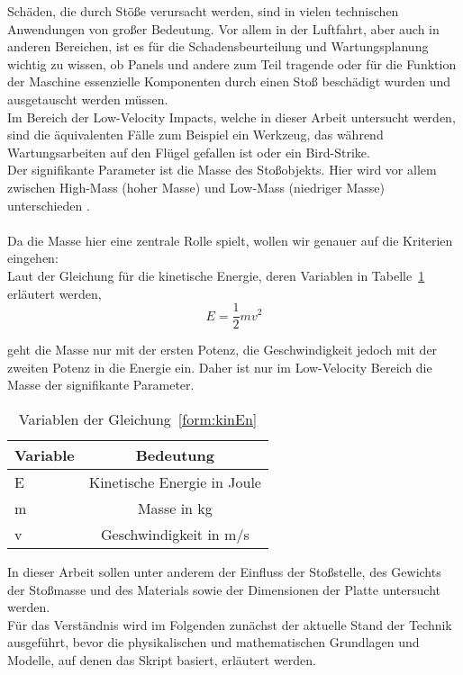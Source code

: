 Schäden, die durch Stöße verursacht werden, sind in vielen technischen
Anwendungen von großer Bedeutung. Vor allem in der Luftfahrt, aber auch in
anderen Bereichen, ist es für die Schadensbeurteilung und Wartungsplanung
wichtig zu wissen, ob Panels und andere zum Teil tragende oder für die Funktion
der Maschine essenzielle Komponenten durch einen Stoß beschädigt wurden und
ausgetauscht werden müssen. \\
Im Bereich der Low-Velocity Impacts, welche in dieser Arbeit untersucht werden,
sind die äquivalenten Fälle zum Beispiel ein Werkzeug, das während
Wartungsarbeiten auf den Flügel gefallen ist oder ein Bird-Strike. \\
Der signifikante Parameter ist die Masse des Stoßobjekts. Hier wird vor allem
zwischen High-Mass (hoher Masse) und Low-Mass (niedriger Masse) unterschieden \cite{Olsson.2000}. \\
\\
Da die Masse hier eine zentrale Rolle spielt, wollen wir genauer auf die
Kriterien eingehen: \\
Laut der Gleichung für die kinetische Energie, deren Variablen in Tabelle~\ref{tab:Tabelle 1} erläutert werden,
\begin{equation}
\label{form:kinEn}
E = \frac{1}{2}mv^2
\end{equation}
 
 geht die Masse nur mit der ersten Potenz, die Geschwindigkeit jedoch mit
 der zweiten Potenz in die Energie ein. Daher ist nur im Low-Velocity Bereich die Masse der signifikante Parameter. 
 
\begin{table}[h!]
	\begin{center}
		\caption{Variablen der Gleichung~\ref{form:kinEn}}
		\label{tab:Tabelle 1}
		\begin{tabular}{l|c}
			\textbf{Variable} & \textbf{Bedeutung}\\
			\hline
			E & Kinetische Energie in Joule\\
			m & Masse in kg\\
			v & Geschwindigkeit in m/s\\
		\end{tabular}
	\end{center}
\end{table}

In dieser Arbeit sollen unter anderem der Einfluss der
Stoßstelle, des Gewichts der Stoßmasse und des Materials sowie der Dimensionen der
Platte untersucht werden. \\
Für das Verständnis wird im Folgenden zunächst der aktuelle Stand der
Technik ausgeführt, bevor die physikalischen und mathematischen Grundlagen und
Modelle, auf denen das Skript basiert, erläutert werden.\\
\\
